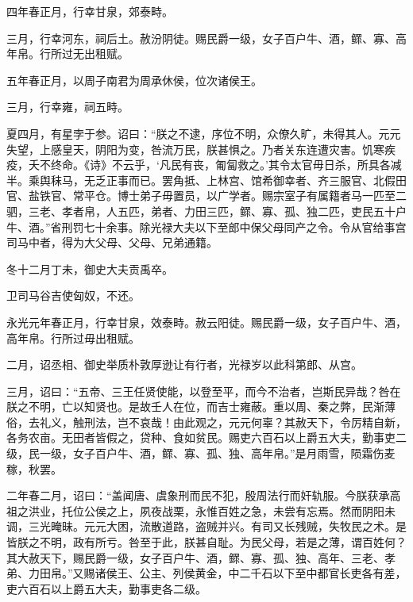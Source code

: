 \documentclass[12pt,UTF8]{ctexbook}
\begin{document}
四年春正月，行幸甘泉，郊泰畤。



三月，行幸河东，祠后土。赦汾阴徒。赐民爵一级，女子百户牛、酒，鳏、寡、高年帛。行所过无出租赋。



五年春正月，以周子南君为周承休侯，位次诸侯王。



三月，行幸雍，祠五畤。



夏四月，有星孛于参。诏曰：“朕之不逮，序位不明，众僚久旷，未得其人。元元失望，上感皇天，阴阳为变，咎流万民，朕甚惧之。乃者关东连遭灾害。饥寒疾疫，夭不终命。《诗》不云乎，‘凡民有丧，匍匐救之。’其令太官毋日杀，所具各减半。乘舆秣马，无乏正事而已。罢角抵、上林宫、馆希御幸者、齐三服官、北假田官、盐铁官、常平仓。博士弟子毋置员，以广学者。赐宗室子有属籍者马一匹至二驷，三老、孝者帛，人五匹，弟者、力田三匹，鳏、寡、孤、独二匹，吏民五十户牛、酒。”省刑罚七十余事。除光禄大夫以下至郎中保父母同产之令。令从官给事宫司马中者，得为大父母、父母、兄弟通籍。



冬十二月丁未，御史大夫贡禹卒。



卫司马谷吉使匈奴，不还。



永光元年春正月，行幸甘泉，效泰畤。赦云阳徒。赐民爵一级，女子百户牛、酒，高年帛。行所过毋出租赋。



二月，诏丞相、御史举质朴敦厚逊让有行者，光禄岁以此科第郎、从宫。



三月，诏曰：“五帝、三王任贤使能，以登至平，而今不治者，岂斯民异哉？咎在朕之不明，亡以知贤也。是故壬人在位，而吉士雍蔽。重以周、秦之弊，民渐薄俗，去礼义，触刑法，岂不哀哉！由此观之，元元何辜？其赦天下，令厉精自新，各务农亩。无田者皆假之，贷种、食如贫民。赐吏六百石以上爵五大夫，勤事吏二级，民一级，女子百户牛、酒，鳏、寡、孤、独、高年帛。”是月雨雪，陨霜伤麦稼，秋罢。



二年春二月，诏曰：“盖闻唐、虞象刑而民不犯，殷周法行而奸轨服。今朕获承高祖之洪业，托位公侯之上，夙夜战栗，永惟百姓之急，未尝有忘焉。然而阴阳未调，三光晻昧。元元大困，流散道路，盗贼并兴。有司又长残贼，失牧民之术。是皆朕之不明，政有所亏。咎至于此，朕甚自耻。为民父母，若是之薄，谓百姓何？其大赦天下，赐民爵一级，女子百户牛、酒，鳏、寡、孤、独、高年、三老、孝弟、力田帛。”又赐诸侯王、公主、列侯黄金，中二千石以下至中都官长吏各有差，吏六百石以上爵五大夫，勤事吏各二级。
\end{document}
